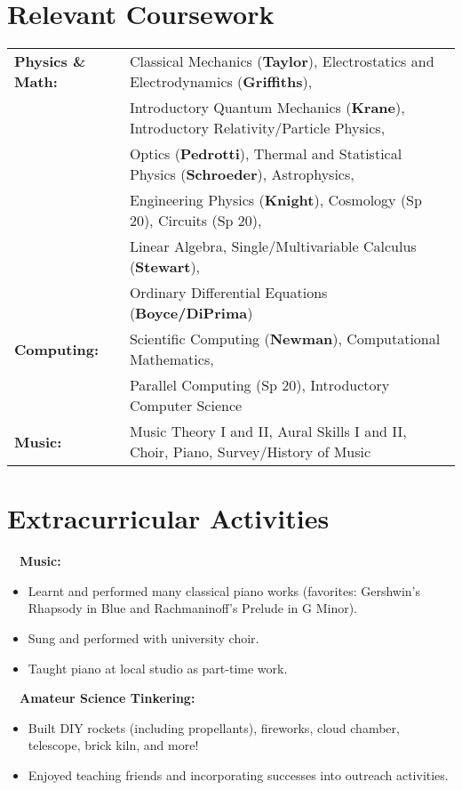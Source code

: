 \documentclass[11pt]{article}
\begin{document}
\section{Relevant Coursework}
\begin{tabular}{ll}
\textbf{Physics \& Math:} &   Classical Mechanics (\textbf{Taylor}), Electrostatics and Electrodynamics (\textbf{Griffiths}), \\
                  &   Introductory Quantum Mechanics (\textbf{Krane}), Introductory Relativity/Particle Physics, \\
                  &   Optics (\textbf{Pedrotti}), Thermal and Statistical Physics (\textbf{Schroeder}), Astrophysics,\\
                  &   Engineering Physics (\textbf{Knight}), Cosmology (Sp 20), Circuits (Sp 20),\\
                  &   Linear Algebra, Single/Multivariable Calculus (\textbf{Stewart}),\\
                  & Ordinary Differential Equations (\textbf{Boyce/DiPrima}) \vspace{1mm} \\
\textbf{Computing:} &   Scientific Computing (\textbf{Newman}), Computational Mathematics, \\
                    &   Parallel Computing (Sp 20), Introductory Computer Science\vspace{1mm} \\
\textbf{Music:}   &   Music Theory I and II, Aural Skills I and II, Choir, Piano, Survey/History of Music \\
\end{tabular}

\section{Extracurricular Activities}
\-\ \-\ \textbf{Music:}
\begin{itemize}[noitemsep]
      \item Learnt and performed many classical piano works (favorites: Gershwin's Rhapsody in Blue and Rachmaninoff's Prelude in G Minor).
      \item Sung and performed with university choir.
      \item Taught piano at local studio as part-time work.
\end{itemize}
\-\ \-\ \textbf{Amateur Science Tinkering:}
\begin{itemize}[noitemsep]
      \item Built DIY rockets (including propellants), fireworks, cloud chamber, telescope, brick kiln, and more!
      \item Enjoyed teaching friends and incorporating successes into outreach activities.
\end{itemize}
\end{document}
